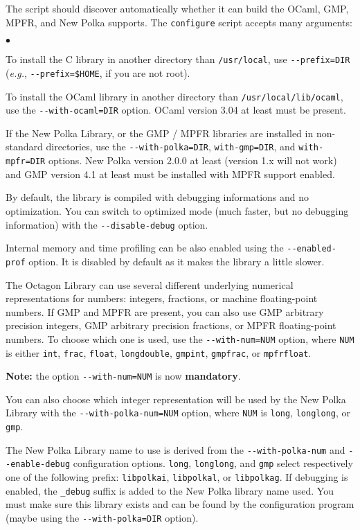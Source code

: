 \documentclass[twosides]{report}
\newenvironment{mylist}
        {\vskip-3mm\begin{list}{$\bullet$}{\setlength{\leftmargin}{.5cm}}}
        {\end{list}}
\begin{document}
\noindent
The script should discover automatically whether it can build the OCaml, GMP,
MPFR, and New Polka supports.
The {\tt configure} script accepts many arguments:
\begin{mylist}
\item To install the C library in another directory than {\tt /usr/local}, use
{\tt -{}-prefix=DIR} ({\em e.g.}, {\tt -{}-prefix=\$HOME}, if you are not root).
\item To install the OCaml library in another directory than
{\tt /usr/local/lib/ocaml}, use the {\tt -{}-with-ocaml=DIR} option.
OCaml version 3.04 at least must be present.

\item If the New Polka Library, or the GMP / MPFR libraries
are installed in non-standard directories, use the
{\tt -{}-with-polka=DIR}, {\tt with-gmp=DIR}, and {\tt with-mpfr=DIR} options.
New Polka version 2.0.0 at least (version 1.x will not work) and
GMP version 4.1 at least must be installed with MPFR support enabled.

\item By default, the library is compiled with debugging informations and
no optimization. 
You can switch to optimized mode (much faster, but no debugging information) 
with the {\tt -{}-disable-debug} option.
\item Internal memory and time profiling can be also enabled using the
{\tt -{}-enabled-prof} option. It is disabled by default as it makes the
library a little slower.
\item The Octagon Library can use several different underlying numerical 
representations for numbers: integers, fractions, or
machine floating-point numbers. 
If GMP and MPFR are present, you can also use GMP arbitrary precision integers,
GMP arbitrary precision fractions, or MPFR floating-point numbers.
To choose which one is used,
use the {\tt -{}-with-num=NUM} option, where {\tt NUM} is either
{\tt int}, {\tt frac}, {\tt float}, {\tt longdouble}, {\tt gmpint}, 
{\tt gmpfrac}, or {\tt mpfrfloat}.

{\bf Note:} the option {\tt -{}-with-num=NUM} is now {\bf mandatory}.

\item You can also choose which integer representation will be used by
the New Polka Library with the {\tt -{}-with-polka-num=NUM} option, where 
{\tt NUM} is {\tt long}, {\tt longlong}, or {\tt gmp}.

The New Polka Library name to use is derived from the {\tt -{}-with-polka-num}
and {\tt -{}-enable-debug} configuration options.
{\tt long}, {\tt longlong}, and {\tt gmp} select respectively one of the 
following prefix: {\tt libpolkai}, {\tt libpolkal}, or {\tt libpolkag}.
If debugging is enabled, the {\tt \_debug} suffix is added to the New Polka 
library name used.
You must make sure this library exists and can be found by the configuration
program (maybe using the {\tt -{}-with-polka=DIR} option).


\end{mylist}
\end{document}
